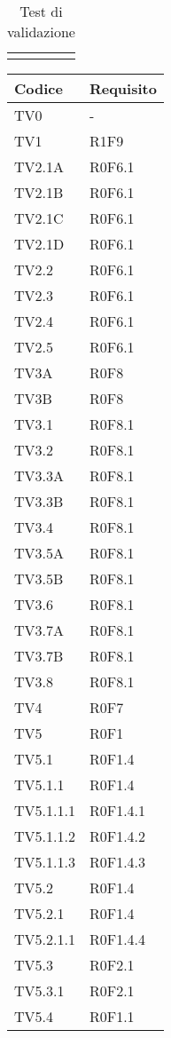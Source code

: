 \documentclass[PianoDiQualifica.tex]{subfiles}
\begin{document}
\begin{longtable}[H]{P{2cm}P{8.5cm}P{3cm}}
	\hiderowcolors
	\caption{Test di validazione}
\end{longtable}

\begin{longtable}[H]{P{6.5cm}P{7cm}}
	\color{CHeaderText}\textbf{Codice} & 
	\color{CHeaderText}\textbf{Requisito} \\
	\endhead
	TV0  & - \\
	TV1  & R1F9 \\
	TV2.1A  & R0F6.1 \\
	TV2.1B  & R0F6.1 \\
	TV2.1C  & R0F6.1 \\
	TV2.1D  & R0F6.1 \\
	TV2.2 &  R0F6.1 \\ 
	TV2.3 &  R0F6.1 \\ 
	TV2.4 &  R0F6.1 \\ 
	TV2.5 &  R0F6.1 \\ 
	TV3A  & R0F8 \\ 
	TV3B  & R0F8 \\ 
	TV3.1  & R0F8.1 \\ 
	TV3.2  & R0F8.1 \\ 
	TV3.3A  & R0F8.1 \\ 
	TV3.3B  & R0F8.1 \\ 
	TV3.4  & R0F8.1 \\ 
	TV3.5A  & R0F8.1 \\ 
	TV3.5B  & R0F8.1 \\ 
	TV3.6  & R0F8.1 \\ 
	TV3.7A  & R0F8.1 \\ 
	TV3.7B  & R0F8.1 \\ 
	TV3.8  & R0F8.1 \\ 
	TV4  & R0F7 \\ 
	TV5  & R0F1 \\ 
	TV5.1  & R0F1.4 \\ 
	TV5.1.1 &  R0F1.4  \\ 
	TV5.1.1.1  &  R0F1.4.1 \\ 
	TV5.1.1.2  & R0F1.4.2 \\ 
	TV5.1.1.3  & R0F1.4.3 \\ 
	TV5.2  & R0F1.4 \\ 
	TV5.2.1  & R0F1.4 \\ 
	TV5.2.1.1  & R0F1.4.4 \\ 
	TV5.3  & R0F2.1 \\ 
	TV5.3.1  & R0F2.1 \\ 
	TV5.4  & R0F1.1 \\ 

\end{longtable}
\end{document}
